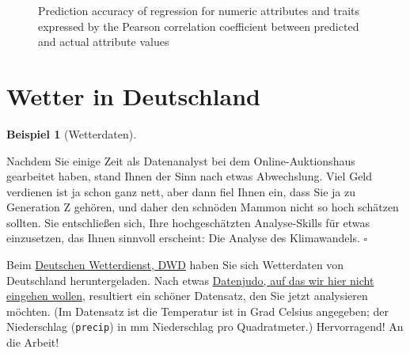 \documentclass[
  letterpaper,
  twoside,
  open=any]{scrbook}
\theoremstyle{definition}
\theoremstyle{definition}
\newtheorem{example}{Beispiel}[chapter]
\theoremstyle{definition}
\theoremstyle{remark}
\begin{document}
\begin{figure}


\caption{\label{fig-pnas1}Prediction accuracy of regression for numeric
attributes and traits expressed by the Pearson correlation coefficient
between predicted and actual attribute values}

\end{figure}%

\section{Wetter in Deutschland}\label{wetter-in-deutschland}

\begin{example}[Wetterdaten]\protect\hypertarget{exm-wetterdaten}{}\label{exm-wetterdaten}

Nachdem Sie einige Zeit als Datenanalyst bei dem Online-Auktionshaus
gearbeitet haben, stand Ihnen der Sinn nach etwas Abwechslung. Viel Geld
verdienen ist ja schon ganz nett, aber dann fiel Ihnen ein, dass Sie ja
zu Generation Z gehören, und daher den schnöden Mammon nicht so hoch
schätzen sollten. Sie entschließen sich, Ihre hochgeschätzten
Analyse-Skills für etwas einzusetzen, das Ihnen sinnvoll erscheint: Die
Analyse des Klimawandels. \(\square\)

\end{example}

Beim \href{https://www.dwd.de/DE/Home/home_node.html}{Deutschen
Wetterdienst, DWD} haben Sie sich Wetterdaten von Deutschland
heruntergeladen. Nach etwas
\href{https://data-se.netlify.app/2022/07/24/preparing-german-weather-data/}{Datenjudo,
auf das wir hier nicht eingehen wollen,} resultiert ein schöner
Datensatz, den Sie jetzt analysieren möchten. (Im Datensatz ist die
Temperatur ist in Grad Celsius angegeben; der Niederschlag
(\texttt{precip}) in mm Niederschlag pro Quadratmeter.) Hervorragend! An
die Arbeit!
\end{document}
